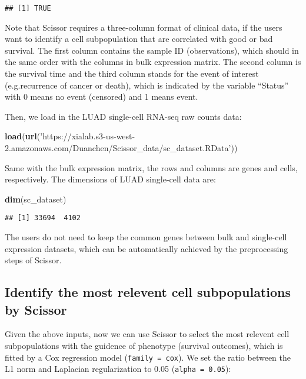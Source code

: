\documentclass[]{article}
\newenvironment{Shaded}{\begin{snugshade}}{\end{snugshade}}
\newcommand{\KeywordTok}[1]{\textcolor[rgb]{0.13,0.29,0.53}{\textbf{#1}}}
\newcommand{\StringTok}[1]{\textcolor[rgb]{0.31,0.60,0.02}{#1}}
\newcommand{\NormalTok}[1]{#1}
\begin{document}
\begin{verbatim}
## [1] TRUE
\end{verbatim}

Note that Scissor requires a three-column format of clinical data, if
the users want to identify a cell subpopulation that are correlated with
good or bad survival. The first column contains the sample ID
(observations), which should in the same order with the columns in bulk
expression matrix. The second column is the survival time and the third
column stands for the event of interest (e.g.recurrence of cancer or
death), which is indicated by the variable ``Status'' with 0 means no
event (censored) and 1 means event.

Then, we load in the LUAD single-cell RNA-seq raw counts data:

\begin{Shaded}
\begin{Highlighting}[]
\KeywordTok{load}\NormalTok{(}\KeywordTok{url}\NormalTok{(}\StringTok{'https://xialab.s3-us-west-2.amazonaws.com/Duanchen/Scissor_data/sc_dataset.RData'}\NormalTok{))}
\end{Highlighting}
\end{Shaded}

Same with the bulk expression matrix, the rows and columns are genes and
cells, respectively. The dimensions of LUAD single-cell data are:

\begin{Shaded}
\begin{Highlighting}[]
\KeywordTok{dim}\NormalTok{(sc_dataset)}
\end{Highlighting}
\end{Shaded}

\begin{verbatim}
## [1] 33694  4102
\end{verbatim}

The users do not need to keep the common genes between bulk and
single-cell expression datasets, which can be automatically achieved by
the preprocessing steps of Scissor.

\subsection{Identify the most relevent cell subpopulations by
Scissor}\label{identify-the-most-relevent-cell-subpopulations-by-scissor}

Given the above inputs, now we can use Scissor to select the most
relevent cell subpopulations with the guidence of phenotype (survival
outcomes), which is fitted by a Cox regression model
(\texttt{family\ =\ \textquotesingle{}cox\textquotesingle{}}). We set
the ratio between the L1 norm and Laplacian regularization to 0.05
(\texttt{alpha\ =\ 0.05}):
\end{document}
